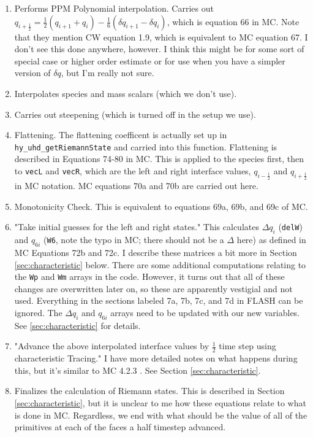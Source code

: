 \documentclass[preprint,11pt]{aastex}
\begin{document}
\begin{description}
\begin{description}
\begin{itemize}
\begin{itemize}
\begin{enumerate}
					\item Performs PPM Polynomial interpolation.   Carries out $q_{i+\frac{1}{2}} = \frac{1}{2} \left( q_{i+1} + q_i \right) - \frac{1}{6} \left( \delta q_{i+1} - \delta q_i \right)$, which is equation 66 in MC.  Note that they mention CW equation 1.9, which is equivalent to MC equation 67.  I don't see this done anywhere, however.  I think this might be for some sort of special case or higher order estimate or for use when you have a simpler version of $\delta q$, but I'm really not sure.
					\item Interpolates species and mass scalars (which we don't use).
					\item Carries out steepening (which is turned off in the setup we use).
					\item Flattening.  The flattening coefficent is actually set up in \verb!hy_uhd_getRiemannState! and carried into this function.  Flattening is described in Equations 74-80 in MC.  This is applied to the species first, then to \verb!vecL! and \verb!vecR!, which are the left and right interface values, $q_{i-\frac{1}{2}}$ and $q_{i+\frac{1}{2}}$ in MC notation.  MC equations 70a and 70b are carried out here. 
					\item Monotonicity Check.  This is equivalent to equations 69a, 69b, and 69c of MC.
					\item "Take initial guesses for the left and right states."  This calculates $\Delta q_i$ (\verb!delW!) and $q_{6i}$ (\verb!W6!, note the typo in MC; there should not be a $\Delta$ here) as defined in MC Equations 72b and 72c.  I describe these matrices a bit more in Section \ref{sec:characteristic} below.  There are some additional computations relating to the \verb!Wp! and \verb!Wm! arrays in the code.  However, it turns out that all of these changes are overwritten later on, so these are apparently vestigial and not used.  Everything in the sections labeled 7a, 7b, 7c, and 7d in FLASH can be ignored. {\color{red} The $\Delta q_i$ and $q_{6i}$ arrays need to be updated with our new variables.  See \ref{sec:characteristic} for details.}
					\item "Advance the above interpolated interface values by $\frac{1}{2}$ time step using characteristic Tracing."  I have more detailed notes on what happens during this, but it's similar to MC 4.2.3 .  See Section \ref{sec:characteristic}.
					\item Finalizes the calculation of Riemann states.  This is described in Section \ref{sec:characteristic}, but it is unclear to me how these equations relate to what is done in MC.  Regardless, we end with what should be the value of all of the primitives at each of the faces a half timestep advanced.

\end{enumerate}
\end{itemize}
\end{itemize}
\end{description}
\end{description}
\end{document}
